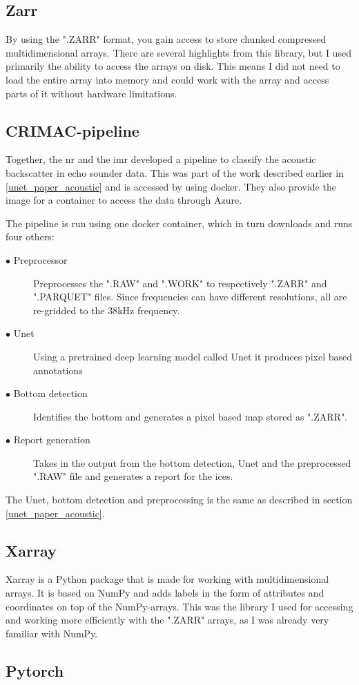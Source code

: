     \subsection{Zarr}
        By using the ".ZARR" \cite{zarr} format, you gain access to store chunked compressed  multidimensional arrays. There are several highlights from this library, but I used primarily the ability to access the arrays on disk. This means I did not need to load the entire array into memory and could work with the array and access parts of it without hardware limitations.
        
    \subsection{CRIMAC-pipeline} \label{CRIMAC-pipeline}
        Together, the \gls{nr} and the \gls{imr} developed a pipeline\cite{crimac_pipeline} to classify the acoustic backscatter in echo sounder data. This was part of the work described earlier in \ref{unet_paper_acoustic} and is accessed by using docker. They also provide the image for a container to access the data through Azure.
        
        The pipeline is run using one docker container, which in turn downloads and runs four others:

            \begin{description}
              \item[$\bullet$ Preprocessor] Preprocesses the ".RAW" and ".WORK" to respectively ".ZARR" and ".PARQUET" files. Since frequencies can have different resolutions, all are re-gridded to the 38kHz frequency.
              \item[$\bullet$ Unet] Using a pretrained deep learning model called Unet it produces pixel based annotations
              \item[$\bullet$ Bottom detection] Identifies the bottom and generates a pixel based map stored as ".ZARR".
              \item[$\bullet$ Report generation] Takes in the output from the bottom detection, Unet and the preprocessed ".RAW" file and generates a report for the \gls{ices}.
    
            \end{description}

        The Unet, bottom detection and preprocessing is the same as described in section \ref{unet_paper_acoustic}.

    \subsection{Xarray}
        Xarray\cite{xarray} is a Python package that is made for working with multidimensional arrays. It is based on NumPy and adds labels in the form of attributes and coordinates on top of the NumPy-arrays. This was the library I used for accessing and working more efficiently with the ".ZARR" arrays, as I was already very familiar with NumPy.
        
        
    \subsection{Pytorch} \label{Pytorch}
    
    